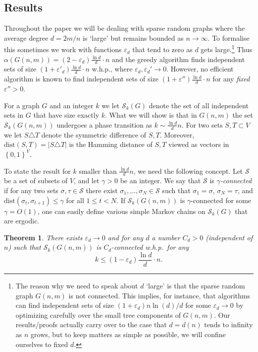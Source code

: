 \documentclass[a4paper,10pt]{article}
\newtheorem{theorem}{Theorem}\renewcommand{\thetheorem}{\arabic{theorem}}
\newcommand\dist{\mathrm{dist}}
\newcommand\cS{\mathcal{S}}
\newcommand\eps{\varepsilon}
\newcommand\ra{\rightarrow}
\newcommand\cbc[1]{\left\{{#1}\right\}}
\newcommand{\whp}{w.h.p.}
\begin{document}
\subsection{Results}\label{sec:Results}

Throughout the paper we will be dealing with sparse random graphs 
where the average degree $d=2m/n$ is `large' but remains bounded
as $n\rightarrow\infty$. To formalise this sometimes we work 
with functions $\eps_d$ that tend to zero as $d$ gets large.\footnote{The reason why we need to speak about $d$ `large' is
	that 	the sparse random graph $G(n,m)$ is not connected. This
	implies, for instance, that algorithms can find independent sets
	of size $(1+\eps_d)n\ln(d)/d$ for some $\eps_d\ra0$ by optimizing
	carefully over the small tree components of $G(n,m)$. Our
	results/proofs actually carry over to the case that $d=d(n)$ tends
	to infinity as $n$ grows, but to keep matters as simple as possible,
	we will	confine ourselves to fixed $d$.}
Thus $\alpha(G(n,m))=(2-\eps_d)\frac{\ln d}d\cdot n$ and the greedy
algorithm finds independent sets of size $(1+\eps'_d)\frac{\ln d}d
\cdot n$ \whp, where $\eps_d,\eps_d'\ra 0$. However, no efficient
algorithm is known to find independent sets of size $(1+\eps'')
\frac{\ln d}d\cdot n$ for any \emph{fixed} $\eps''>0$.


For a graph $G$ and an integer $k$ we let $\cS_k(G)$ denote the set
of all independent sets in $G$ that have size exactly $k$. What we
will show is that in $G(n,m)$ the set $\cS_k(G(n,m))$ undergoes a
phase transition as $k\sim\frac{\ln d}dn$. For two sets $S,T\subset
V$ we let $S\triangle T$ denote the symmetric difference of $S,T$.
Moreover, $\dist(S,T)=|S\triangle T|$ is the Hamming distance of
$S,T$ viewed as vectors in $\cbc{0,1}^V$.


To state the result for $k$ smaller than $\frac{\ln d}dn$, we need
the following concept. Let $\cS$ be a set of subsets of $V$, and
let $\gamma>0$ be an integer. We say that $\cS$ is {\em $\gamma$-connected}
if for any two sets $\sigma,\tau\in\cS$ there exist $\sigma_1,\ldots,\sigma_N\in\cS$
such that $\sigma_1=\sigma$, $\sigma_N=\tau$, and $\dist(\sigma_t,\sigma_{t+1})\leq \gamma$
for all $1\leq t<N$. If $\cS_k(G(n,m))$ is $\gamma$-connected for
some $\gamma=O(1)$, one can easily define various simple Markov
chains on $\cS_k(G)$ that are ergodic.

\begin{theorem}\label{thrm:Connectivity}
There exists $\eps_d\ra0$ and for any $d$ a number $C_d>0$ (independent
of $n$) such that $\cS_k(G(n,m))$ is $C_d$-connected \whp\
for any
	$$k\leq(1-\eps_d)\frac{\ln d}d\cdot n.$$
\end{theorem}
\end{document}
